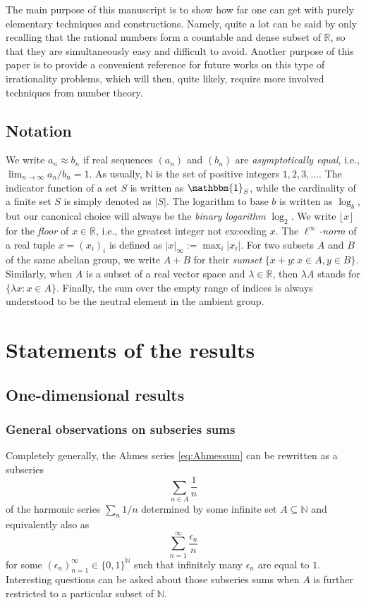 \documentclass[11pt,letterpaper,reqno]{amsart}
\numberwithin{equation}{section}
\theoremstyle{definition}
\numberwithin{equation}{section}
\begin{document}
The main purpose of this manuscript is to show how far one can get with purely elementary techniques and constructions. Namely, quite a lot can be said by only recalling that the rational numbers form a countable and dense subset of $\mathbb{R}$, so that they are simultaneously easy and difficult to avoid.
Another purpose of this paper is to provide a convenient reference for future works on this type of irrationality problems, which will then, quite likely, require more involved techniques from number theory.

\subsection{Notation}
We write $a_n\approx b_n$ if real sequences $(a_n)$ and $(b_n)$ are \emph{asymptotically equal}, i.e., $\lim_{n\to\infty} a_n/b_n=1$.
As usually, $\mathbb{N}$ is the set of positive integers $1,2,3,\ldots$.
The indicator function of a set $S$ is written as $\mathbbm{1}_S$, while the cardinality of a finite set $S$ is simply denoted as $|S|$.
The logarithm to base $b$ is written as $\log_b$, but our canonical choice will always be the \emph{binary logarithm} $\log_2$.
We write $\lfloor x\rfloor$ for the \emph{floor} of $x\in\mathbb{R}$, i.e., the greatest integer not exceeding $x$.
The \emph{$\ell^\infty$-norm} of a real tuple $x=(x_i)_i$ is defined as $|x|_{\infty} := \max_i |x_i|$.
For two subsets $A$ and $B$ of the same abelian group, we write $A+B$ for their \emph{sumset} $\{x+y : x\in A, y\in B\}$.
Similarly, when $A$ is a subset of a real vector space and $\lambda\in\mathbb{R}$, then $\lambda A$ stands for $\{\lambda x : x\in A\}$.
Finally, the sum over the empty range of indices is always understood to be the neutral element in the ambient group.


\section{Statements of the results}

\subsection{One-dimensional results}

\subsubsection{General observations on subseries sums}
Completely generally, the Ahmes series \eqref{eq:Ahmessum} can be rewritten as a subseries
\begin{equation}\label{eq:subseries}
\sum_{n\in A} \frac{1}{n}
\end{equation}
of the harmonic series $\sum_n 1/n$ determined by some infinite set $A\subseteq\mathbb{N}$ and equivalently also as
\[ \sum_{n=1}^{\infty} \frac{\epsilon_n}{n} \]
for some $(\epsilon_n)_{n=1}^{\infty}\in\{0,1\}^{\mathbb{N}}$ such that infinitely many $\epsilon_n$ are equal to $1$.
Interesting questions can be asked about those subseries sums when $A$ is further restricted to a particular subset of $\mathbb{N}$.
\end{document}
